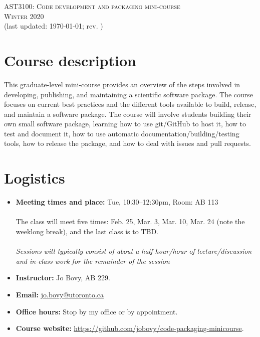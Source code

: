 \documentclass{article}
\begin{document}
\begin{center}
  \LARGE{\scshape{AST3100: Code development and packaging mini-course}}\\[5pt]
  \Large{\scshape{Winter 2020}}\\[5pt]
  \large{(last updated: \today; rev. \githash)}\\[25pt]
\end{center}

\section*{Course description}

This graduate-level mini-course provides an overview of the steps
involved in developing, publishing, and maintaining a scientific
software package. The course focuses on current best practices and the
different tools available to build, release, and maintain a software
package. The course will involve students building their own small
software package, learning how to use git/GitHub to host it, how to
test and document it, how to use automatic
documentation/building/testing tools, how to release the package, and
how to deal with issues and pull requests.

\section*{Logistics}

\begin{itemize}

  \item {\bf Meeting times and place:} Tue, 10:30--12:30pm, Room: AB
    113\\\\The class will meet five times: Feb. 25, Mar. 3, Mar. 10,
    Mar. 24 (note the weeklong break), and the last class is to
    TBD.\\\\\emph{Sessions will typically consist of about a
      half-hour/hour of lecture/discussion and in-class work for the
      remainder of the session}

  \item {\bf Instructor:} Jo Bovy, AB 229.

  \item {\bf Email:} \href{mailto:jo.bovy@utoronto.ca}{jo.bovy@utoronto.ca}

  \item {\bf Office hours:} Stop by my office or by appointment.

  \item {\bf Course website:} \url{https://github.com/jobovy/code-packaging-minicourse}.

\end{itemize}
\end{document}
